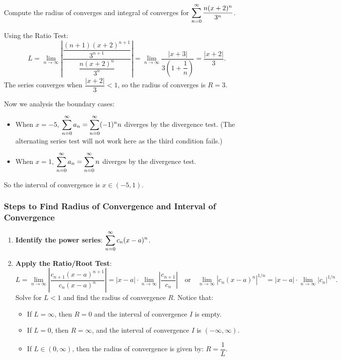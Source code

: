 \begin{ex}  
    Compute the radius of converges and integral of converges for $\displaystyle\sum_{n=0}^\infty \dfrac{n(x+2)^n}{3^n}$.

    Using the Ratio Test:
    \[ L = \lim_{n\to \infty} \left| \dfrac{\dfrac{(n+1)(x+2)^{n+1}}{3^{n+1}}}{\dfrac{n(x+2)^n}{3^n}}\right| = \lim_{n\to \infty} \dfrac{|x+3|}{3\left(1+\dfrac{1}{n}\right)} = \dfrac{|x+2|}{3}.\]
    The series converges when $\dfrac{|x+2|}{3}< 1$, so the radius of converges is $R=3$.
    
    Now we analysis the boundary cases:
    
    \begin{itemize}
        \item When $x=-5$, $\displaystyle\sum_{n=0}^\infty  a_n = \displaystyle\sum_{n=0}^\infty (-1)^n n$ diverges by the divergence test. (The alternating series test will not work here as the third condition fails.)

        \item When $x=1$, $\displaystyle\sum_{n=0}^\infty  a_n = \displaystyle\sum_{n=0}^\infty n$ diverges by the divergence test. 
    \end{itemize}

    So the interval of convergence is $x \in (-5,1)$.
\end{ex}

\subsubsection{Steps to Find Radius of Convergence and Interval of Convergence}
\begin{enumerate}
    \item \textbf{Identify the power series}: $\displaystyle\sum_{n=0}^\infty c_n (x - a)^n$.

    \item \textbf{Apply the Ratio/Root Test}:
    \[
    L = \lim_{n \to \infty} \left| \dfrac{c_{n+1}(x-a)^{n+1}}{c_n(x-a)^n} \right| = |x-a| \cdot \lim_{n \to \infty} \left| \dfrac{c_{n+1}}{c_n} \right| \quad \text{or}\quad \lim_{n \to \infty} |c_n(x-a)^n|^{1/n} = |x-a| \cdot \lim_{n \to \infty} |c_n|^{1/n}.
    \]
    Solve for $L < 1$ and find the radius of convergence $R$.
Notice that:
\begin{itemize}
    \item If $L = \infty$, then $R = 0$ and the interval of convergence $I$ is empty.
    \item If $L = 0$, then $R = \infty$, and the interval of convergence $I$ is $(-\infty, \infty)$.
    \item If $L \in (0, \infty)$, then the radius of convergence is given by: $R = \dfrac{1}{L}$.
\end{itemize}
\end{enumerate}


